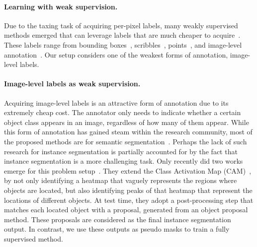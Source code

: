 \documentclass{bmvc2k}
\begin{document}
\paragraph{Learning with weak supervision.}
Due to the taxing task of acquiring per-pixel labels, many weakly supervised methods emerged that can leverage labels that are much cheaper to acquire~\cite{everingham2010pascal, cordts2016cityscapes}.  These labels range from bounding boxes~\cite{khoreva2017simple}, scribbles~\cite{lin2016scribblesup}, points~\cite{bearman2016s, laradji2018blobs, Laradji2019InstanceSW}, and image-level annotation~\cite{Zhou2018PRM}. Our setup considers one of the weakest forms of annotation, image-level labels.


\paragraph{Image-level labels as weak supervision.}
Acquiring image-level labels is an attractive form of annotation due to its extremely cheap cost. The annotator only needs to indicate whether a certain object class appears in an image, regardless of how many of them appear. While this form of annotation has gained steam within the research community, most of the proposed methods are for semantic segmentation~\cite{he2016deep,Tang2018WSOD,ahn2018learning}. Perhaps the lack of such research for instance segmentation is partially accounted for by the fact that instance segmentation is a more challenging task. Only recently did two works emerge for this problem setup~\cite{Zhou2018PRM, cholakkal2019object}. They extend the Class Activation Map (CAM)~\cite{zhou2016cam}, by not only identifying a heatmap that vaguely represents the regions where objects are located, but also identifying peaks of that heatmap that represent the locations of different objects. At test time, they adopt a post-processing step that matches each located object with a proposal, generated from an object proposal method. These proposals are considered as the final instance segmentation output. In contrast, we use these outputs as pseudo masks to train a fully supervised method.
\end{document}
